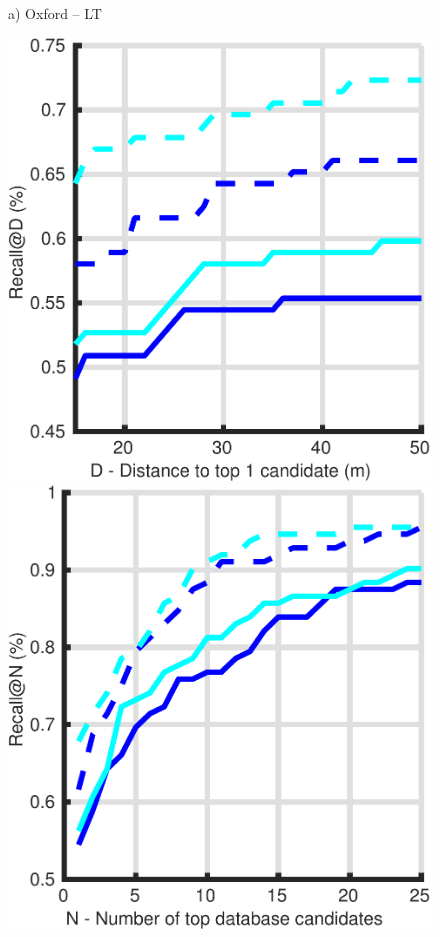 \begin{figure}
\begin{minipage}{0.27\linewidth}
		a) Oxford -- LT
	\end{minipage}
	\begin{minipage}{0.27\linewidth}
		\center \scriptsize
		\includegraphics[width=\linewidth]{plot/night_ft/Results_snow_queries/distance}	
		
		\includegraphics[width=\linewidth]{plot/night_ft/Results_snow_queries/recall}
				

\end{minipage}
\end{figure}
